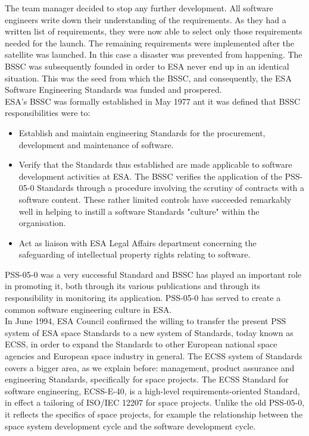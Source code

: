 The team manager decided to stop any further development. All software engineers write down their understanding of the requirements.
As they had a written list of requirements, they were now able to select only
those requirements needed for the launch. The remaining requirements were implemented after
the satellite was launched. In this case a disaster was prevented from happening\cite{Zwartjes05anagile}.
The \ac{BSSC} was subsequently founded in order to \ac{ESA} never end up in an identical situation. This was the seed from
which the \ac{BSSC}, and consequently, the \ac{ESA} Software Engineering Standards was funded and prospered.\\
\ac{ESA}'s \ac{BSSC} was formally established in May 1977 ant it was defined that \ac{BSSC} responsibilities were to:
\begin{itemize}
\item Establish and maintain engineering Standards for the procurement, development and maintenance of software.
\item Verify that the Standards thus established are made applicable to software
development activities at \ac{ESA}. The \ac{BSSC} verifies the application of the PSS-05-0\cite{pss-05-0} Standards through a procedure involving the
scrutiny of contracts with a software content.
These rather limited controls have succeeded remarkably well in helping to instill a software Standards "culture" within the organisation.
\item Act as liaison with \ac{ESA} Legal Affairs department concerning the safeguarding of intellectual
property rights relating to software.
\end{itemize}
PSS-05-0 was a very successful Standard and \ac{BSSC} has played an important role in promoting it, both through its various
publications and through its responsibility in monitoring its application. PSS-05-0 has served to create a common software engineering culture in \ac{ESA}\cite{esa-bulletin-90}.\\
In June 1994, \ac{ESA} Council confirmed the willing to transfer the present PSS system of \ac{ESA} space Standards to a new system
of Standards, today known as \ac{ECSS}, in order to expand the Standards 
to other European national space agencies and European space industry in general.
The \ac{ECSS} system of Standards covers a bigger area, as we explain before: management, product assurance and engineering Standards, specifically for space projects.
The \ac{ECSS} Standard for software engineering, ECSS-E-40\cite{ecss-e-st-40c}, is a high-level requirements-oriented Standard, in effect a tailoring of ISO/IEC 12207 for space projects.
Unlike the old PSS-05-0, it reflects the specifics of space projects, for example the relationship between the space system development cycle and the software development cycle\cite{esa-bulletin-90}.

